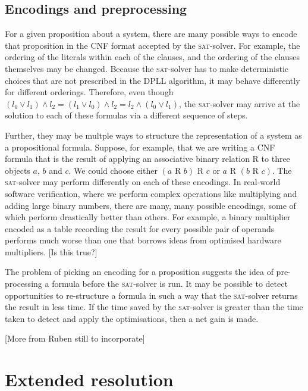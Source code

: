 \documentclass[proof,pdftex,11pt,a4,titlepage]{article}
\newcommand{\sat}{\textsc{sat}}
\begin{document}
\subsection{Encodings and preprocessing}

For a given proposition about a system, there are many possible ways to encode that proposition in the CNF format accepted by the \sat{}-solver. For example, the ordering of the literals within each of the clauses, and the ordering of the clauses themselves may be changed. Because the \sat{}-solver has to make deterministic choices that are not prescribed in the DPLL algorithm, it may behave differently for different orderings. Therefore, even though $(l_0 \vee l_1) \wedge l_2 = (l_1 \vee l_0) \wedge l_2 = l_2 \wedge (l_0 \vee l_1)$, the \sat{}-solver may arrive at the solution to each of these formulas via a different sequence of steps.

Further, they may be multple ways to structure the representation of a system as a propositional formula. Suppose, for example, that we are writing a CNF formula that is the result of applying an associative binary relation R to three objects $a$, $b$ and $c$. We could choose either $(a\mbox{ R }b)\mbox{ R }c$ or $a\mbox{ R }(b\mbox{ R }c)$. The \sat{}-solver may perform differently on each of these encodings. In real-world software verification, where we perform complex operations like multiplying and adding large binary numbers, there are many, many possible encodings, some of which perform drastically better than others. For example, a binary multiplier encoded as a table recording the result for every possible pair of operands performs much worse than one that borrows ideas from optimised hardware multipliers. [Is this true?]

The problem of picking an encoding for a proposition suggests the idea of pre-processing a formula before the \sat{}-solver is run. It may be possible to detect opportunities to re-structure a formula in such a way that the \sat{}-solver returns the result in less time. If the time saved by the \sat{}-solver is greater than the time taken to detect and apply the optimisations, then a net gain is made.

[More from Ruben still to incorporate]

\section{Extended resolution}
\end{document}
